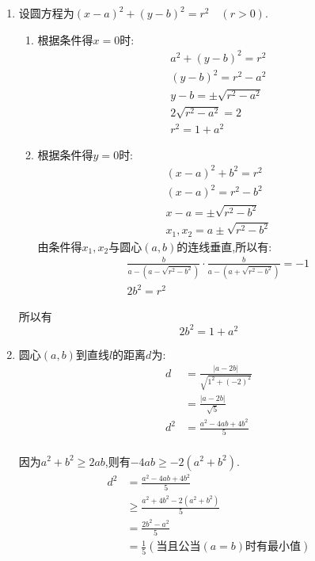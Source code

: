 \documentclass[answers]{exam}
\begin{document}
\begin{questions}
	\begin{solution}
		\begin{enumerate}[label=(\arabic*)]
			\item 设圆方程为$(x-a)^2 + (y-b)^2 = r^2\quad(r>0)$.
			      \begin{enumerate}[label=\Roman*]
				      \item 根据条件得$x=0$时:
				            \begin{align*}
					            a^2 + (y-b)^2 = r^2      \\
					            (y-b)^2 = r^2- a^2       \\
					            y- b = \pm\sqrt{r^2-a^2} \\
					            2\sqrt{r^2-a^2} = 2      \\
					            r^2 = 1 + a^2
				            \end{align*}
				      \item 根据条件得$y=0$时:
				            \begin{align*}
					            (x-a)^2 + b^2 = r^2     \\
					            (x-a)^2 = r^2-b^2       \\
					            x-a = \pm\sqrt{r^2-b^2} \\
					            x_1, x_2 = a \pm\sqrt{r^2-b^2}
				            \end{align*}
				            由条件得$x_1,x_2$与圆心$(a,b)$的连线垂直,所以有:
				            \begin{align*}
					            \frac{b}{a-(a-\sqrt{r^2-b^2})}\cdot\frac{b}{a-(a+\sqrt{r^2 - b^2})} = -1 \\
					            2b^2 = r^2
				            \end{align*}
			      \end{enumerate}
			      所以有
			      \begin{equation*}
				      2b^2=1+a^2 \tag{a}
			      \end{equation*}
			\item 圆心$(a,b)$到直线$l$的距离$d$为:
			      \begin{align*}
				      d   & = \frac{|a - 2b|}{\sqrt{1^2 + (-2)^2}} \\
				          & = \frac{|a-2b|}{\sqrt{5}}              \\
				      d^2 & = \frac{a^2 - 4ab + 4b^2}{5}           \\
			      \end{align*}

			      因为$a^2 + b^2 \geqslant 2ab$,则有$-4ab \geqslant -2(a^2+b^2)$.
			      \begin{align*}
				      d^2 & = \frac{a^2 - 4ab + 4b^2}{5}              \\
				          & \geqslant \frac{a^2 +4b^2 -2(a^2+b^2)}{5} \\
				          & = \frac{2b^2 - a^2}{5}                    \\
				          & = \frac{1}{5} (\text{当且公当}(a=b)时有最小值)
			      \end{align*}


\end{enumerate}
\end{solution}
\end{questions}
\end{document}
